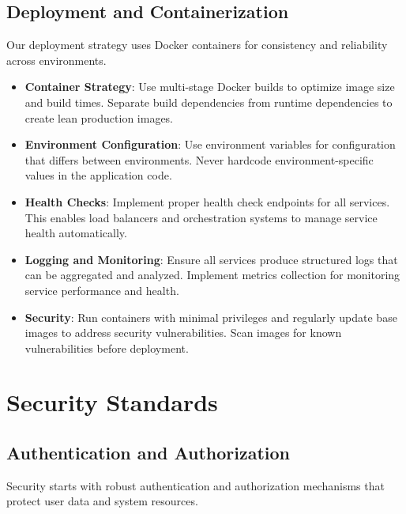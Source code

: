 \documentclass[12pt]{article}
\begin{document}
\subsection{Deployment and Containerization}
Our deployment strategy uses Docker containers for consistency and reliability across environments.

\begin{itemize}
    \item \textbf{Container Strategy}: Use multi-stage Docker builds to optimize image size and build times. Separate build dependencies from runtime dependencies to create lean production images.
    
    \item \textbf{Environment Configuration}: Use environment variables for configuration that differs between environments. Never hardcode environment-specific values in the application code.
    
    \item \textbf{Health Checks}: Implement proper health check endpoints for all services. This enables load balancers and orchestration systems to manage service health automatically.
    
    \item \textbf{Logging and Monitoring}: Ensure all services produce structured logs that can be aggregated and analyzed. Implement metrics collection for monitoring service performance and health.
    
    \item \textbf{Security}: Run containers with minimal privileges and regularly update base images to address security vulnerabilities. Scan images for known vulnerabilities before deployment.
\end{itemize}

\section{Security Standards}

\subsection{Authentication and Authorization}
Security starts with robust authentication and authorization mechanisms that protect user data and system resources.
\end{document}
